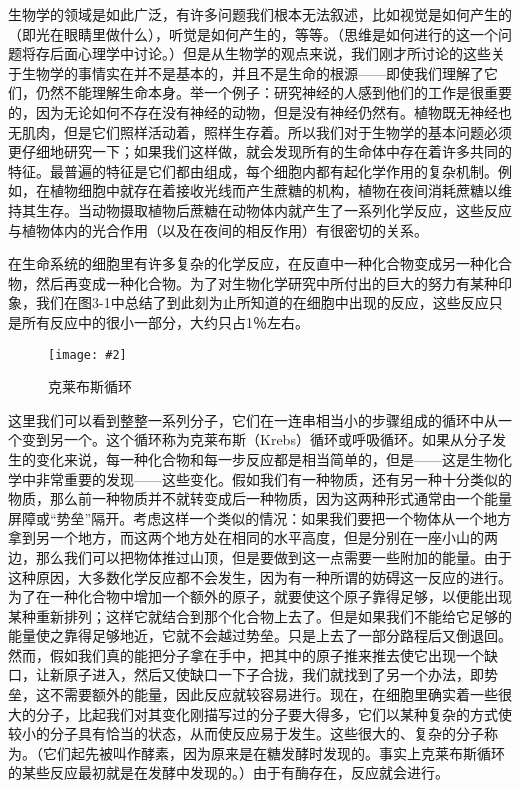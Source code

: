\documentclass[12pt,oneside]{book}
\newenvironment{linefig}[2][1]
{\begin{figure}[H]
\centering
\texttt{[image: \#2]}}
{\end{figure}}
\begin{document}
生物学的领域是如此广泛，有许多问题我们根本无法叙述，比如视觉是如何产生的（即光在眼睛里做什么），听觉是如何产生的，等等。（思维是如何进行的这一个问题将存后面心理学中讨论。）但是从生物学的观点来说，我们刚才所讨论的这些关于生物学的事情实在并不是基本的，并且不是生命的根源——即使我们理解了它们，仍然不能理解生命本身。举一个例子：研究神经的人感到他们的工作是很重要的，因为无论如何不存在没有神经的动物，但是没有神经仍然有。植物既无神经也无肌肉，但是它们照样活动着，照样生存着。所以我们对于生物学的基本问题必须更仔细地研究一下；如果我们这样做，就会发现所有的生命体中存在着许多共同的特征。最普遍的特征是它们都由组成，每个细胞内都有起化学作用的复杂机制。例如，在植物细胞中就存在着接收光线而产生蔗糖的机构，植物在夜间消耗蔗糖以维持其生存。当动物摄取植物后蔗糖在动物体内就产生了一系列化学反应，这些反应与植物体内的光合作用（以及在夜间的相反作用）有很密切的关系。

在生命系统的细胞里有许多复杂的化学反应，在反直中一种化合物变成另一种化合物，然后再变成一种化合物。为了对生物化学研究中所付出的巨大的努力有某种印象，我们在图3-1中总结了到此刻为止所知道的在细胞中出现的反应，这些反应只是所有反应中的很小一部分，大约只占1％左右。
\begin{linefig}{克莱布斯循环}
\caption{克莱布斯循环}
\label{fig:克莱布斯循环}
\end{linefig}

这里我们可以看到整整一系列分子，它们在一连串相当小的步骤组成的循环中从一个变到另一个。这个循环称为克莱布斯（Krebs）循环或呼吸循环。如果从分子发生的变化来说，每一种化合物和每一步反应都是相当简单的，但是——这是生物化学中非常重要的发现——这些变化。假如我们有一种物质，还有另一种十分类似的物质，那么前一种物质并不就转变成后一种物质，因为这两种形式通常由一个能量屏障或“势垒”隔开。考虑这样一个类似的情况：如果我们要把一个物体从一个地方拿到另一个地方，而这两个地方处在相同的水平高度，但是分别在一座小山的两边，那么我们可以把物体推过山顶，但是要做到这一点需要一些附加的能量。由于这种原因，大多数化学反应都不会发生，因为有一种所谓的妨碍这一反应的进行。为了在一种化合物中增加一个额外的原子，就要使这个原子靠得足够，以便能出现某种重新排列；这样它就结合到那个化合物上去了。但是如果我们不能给它足够的能量使之靠得足够地近，它就不会越过势垒。只是上去了一部分路程后又倒退回。然而，假如我们真的能把分子拿在手中，把其中的原子推来推去使它出现一个缺口，让新原子进入，然后又使缺口一下子合拢，我们就找到了另一个办法，即势垒，这不需要额外的能量，因此反应就较容易进行。现在，在细胞里确实着一些很大的分子，比起我们对其变化刚描写过的分子要大得多，它们以某种复杂的方式使较小的分子具有恰当的状态，从而使反应易于发生。这些很大的、复杂的分子称为。（它们起先被叫作酵素，因为原来是在糖发酵时发现的。事实上克莱布斯循环的某些反应最初就是在发酵中发现的。）由于有酶存在，反应就会进行。
\end{document}

